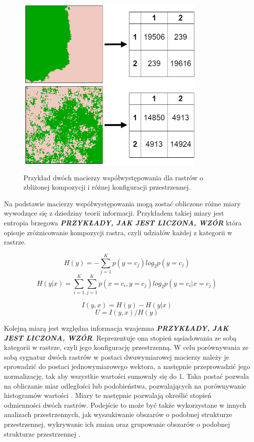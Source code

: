 \documentclass{amuthesis}
\begin{document}
\begin{figure}[t]

{\centering \includegraphics[width=3.64583in,height=3.64583in]{figures/diagram_coma.png}

}

\caption{\label{fig-metody-coma}Przykład dwóch macierzy
współwystępowania dla rastrów o zbliżonej kompozycji i różnej
konfiguracji przestrzennej.}

\end{figure}

Na podstawie macierzy współwystępowania mogą zostać obliczone różne
miary wywodzące się z dziedziny teorii informacji. Przykładem takiej
miary jest entropia brzegowa \textbf{\emph{PRZYKŁADY, JAK JEST LICZONA,
WZÓR}} która opisuje zróżnicowanie kompozycji rastra, czyli udziałów
każdej z kategorii w rastrze.

\[
H(y) = -\sum_{j=1}^{K}p(y=c_{j})log_2p(y=c_j)
\] \[
H(y|x) = \sum_{i=1}^{K}\sum_{j=1}^{K} p(x=c_i, y=c_j) log_2 p(y=c_i | x=c_j)
\]

\[
I(y,x) = H(y) - H(y|x)
\] \[
U = I(y,x)/H(y)
\]

Kolejną miarą jest względna informacja wzajemna \textbf{\emph{PRZYKŁADY,
JAK JEST LICZONA, WZÓR}}. Reprezentuje ona stopień sąsiadowania ze sobą
kategorii w rastrze, czyli jego konfigurację przestrzenną. W celu
porównywania ze sobą sygnatur dwóch rastrów w postaci dwuwymiarowej
macierzy należy je sprowadzić do postaci jednowymiarowego wektora, a
następnie przeprowadzić jego normalizację, tak aby wszystkie wartości
sumowały się do 1. Taka postać pozwala na obliczanie miar odległości lub
podobieństwa, pozwalających na porównywanie histogramów wartości
\autocite{Cha2007}. Miary te następnie pozwalają określić stopień
odmienności dwóch rastrów. Podejście to może być także wykorzystane w
innych analizach przestrzennych, jak wyszukiwanie obszarów o podobnej
strukturze przestrzennej, wykrywanie ich zmian oraz grupowanie obszarów
o podobnej strukturze przestrzennej
\autocite{Jasiewicz_GeoPAT,nowosad_motif}.
\end{document}
